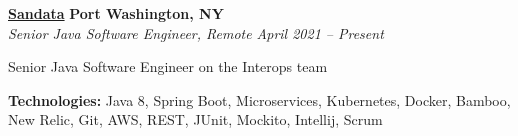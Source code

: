 %
    \headerrow
        {\textbf{\href{https://www.sandata.com/}{Sandata}}}
        {\textbf{Port Washington, NY}}
    \\
    \headerrow
        {\emph{Senior Java Software Engineer, Remote}}
        {\emph{April 2021 -- Present}}
    \begin{itemize*}
        \item Senior Java Software Engineer on the Interops team
    \end{itemize*}

    \hspace{1.0em}
        {\textbf{Technologies:} Java 8, Spring Boot, Microservices, Kubernetes, Docker, Bamboo, New Relic,
        Git, AWS, REST, JUnit, Mockito, Intellij, Scrum}

